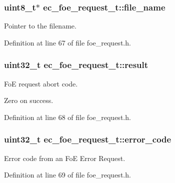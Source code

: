 \subsubsection[{file\-\_\-name}]{\setlength{\rightskip}{0pt plus 5cm}uint8\-\_\-t$\ast$ ec\-\_\-foe\-\_\-request\-\_\-t\-::file\-\_\-name}\label{structec__foe__request__t_a9ff443ccddd8bd0492f364abb7fd4a32}


Pointer to the filename. 



Definition at line 67 of file foe\-\_\-request.\-h.

\subsubsection[{result}]{\setlength{\rightskip}{0pt plus 5cm}uint32\-\_\-t ec\-\_\-foe\-\_\-request\-\_\-t\-::result}\label{structec__foe__request__t_a3755f2ecc7d79a09afc8d567b11b7aef}


Fo\-E request abort code. 

Zero on success. 

Definition at line 68 of file foe\-\_\-request.\-h.

\subsubsection[{error\-\_\-code}]{\setlength{\rightskip}{0pt plus 5cm}uint32\-\_\-t ec\-\_\-foe\-\_\-request\-\_\-t\-::error\-\_\-code}\label{structec__foe__request__t_a61bb591aa99ad14d759e67c687b11d5d}


Error code from an Fo\-E Error Request. 



Definition at line 69 of file foe\-\_\-request.\-h.

